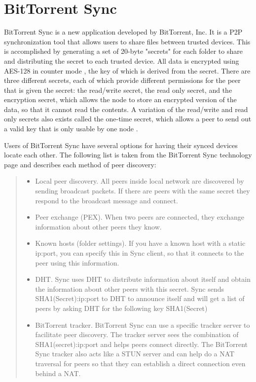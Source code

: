 \documentclass[12pt]{report}
\begin{document}
\section{BitTorrent Sync}
BitTorrent Sync is a new application developed by BitTorrent, Inc. It is a P2P synchronization tool that allows users to share files between trusted devices. This is accomplished by generating a set of 20-byte "secrets" for each folder to share and distributing the secret to each trusted device. All data is encrypted using AES-128 in counter mode \cite{btsynctech}, the key of which is derived from the secret. There are three different secrets, each of which provide different permissions for the peer that is given the secret: the read/write secret, the read only secret, and the encryption secret, which allows the node to store an encrypted version of the data, so that it cannot read the contents. A variation of the read/write and read only secrets also exists called the one-time secret, which allows a peer to send out a valid key that is only usable by one node \cite{btsyncuserguide}.

Users of BitTorrent Sync have several options for having their synced devices locate each other. The following list is taken from the BitTorrent Sync technology page \cite{btsynctech} and describes each method of peer discovery:

\begin{quote}
\begin{itemize}
\item Local peer discovery. All peers inside local network are discovered by sending broadcast packets. If there are peers with the same secret they respond to the broadcast message and connect.
\item Peer exchange (PEX). When two peers are connected, they exchange information about other peers they know.
\item Known hosts (folder settings). If you have a known host with a static ip:port, you can specify this in Sync client, so that it connects to the peer using this information.
\item DHT. Sync uses DHT to distribute information about itself and obtain the information about other peers with this secret. Sync sends SHA1(Secret):ip:port to DHT to announce itself and will get a list of peers by asking DHT for the following key SHA1(Secret)
\item BitTorrent tracker. BitTorrent Sync can use a specific tracker server to facilitate peer discovery. The tracker server sees the combination of SHA1(secret):ip:port and helps peers connect directly. The BitTorrent Sync tracker also acts like a STUN server and can help do a NAT traversal for peers so that they can establish a direct connection even behind a NAT.
\end{itemize}
\end{quote}
\end{document}
